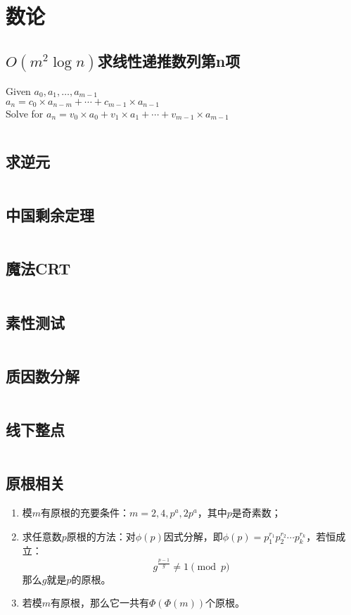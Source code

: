 \chapter{数论}
\section{$O(m^2\log n)$求线性递推数列第n项}
Given $a_0, a_1, \ldots, a_{m - 1}$\\
	$a_n = c_0 \times a_{n - m} + \cdots + c_{m - 1} \times a_{n - 1}$\\
	Solve for $a_n = v_0 \times a_0 + v_1 \times a_1 + \cdots + v_{m - 1} \times a_{m - 1}$\\
\inputminted{cpp}{\source/number-theory/linear-recurrence.cpp}
\section{求逆元}
\inputminted{cpp}{\source/number-theory/get-inversion.cpp}
\section{中国剩余定理}
\inputminted{cpp}{\source/number-theory/chinese-remainder-theorem.cpp}
\section{魔法CRT}
\inputminted{cpp}{\source/number-theory/magic-crt.cpp}
\section{素性测试}
\inputminted{cpp}{\source/number-theory/primality-test.cpp}
\section{质因数分解}
\inputminted{cpp}{\source/number-theory/pollards-rho-algorithm.cpp}
\section{线下整点}
\inputminted{cpp}{\source/number-theory/integer-lattice-under-segment.cpp}
\section{原根相关}
	\begin{enumerate}
		\item 模$m$有原根的充要条件：$m = 2, 4, p^a, 2p^a$，其中$p$是奇素数；
		\item 求任意数$p$原根的方法：对$\phi(p)$因式分解，即$\phi(p) = p_1^{r_1}p_2^{r_2}\cdots p_k^{r_k}$，若恒成立：
			\[g^{\frac{p - 1}{g}} \neq 1 \pmod{p}\]
				那么$g$就是$p$的原根。
		\item 若模$m$有原根，那么它一共有$\Phi(\Phi(m))$个原根。
	\end{enumerate}
